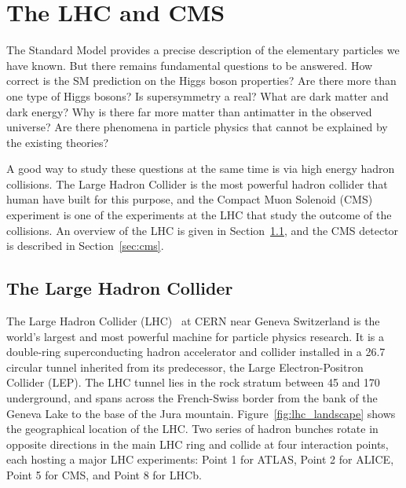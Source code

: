 \chapter{The LHC and CMS}\label{chp:LHC_CMS}

The Standard Model provides a precise description of the elementary particles we have known.
But there remains fundamental questions to be answered.
How correct is the SM prediction on the Higgs boson properties?
Are there more than one type of Higgs bosons?
Is supersymmetry a real?
What are dark matter and dark energy?
Why is there far more matter than antimatter in the observed universe?
Are there phenomena in particle physics that cannot be explained by the existing theories?

A good way to study these questions at the same time is via high energy hadron collisions.
The Large Hadron Collider is the most powerful hadron collider that human have built for this purpose,
and the Compact Muon Solenoid (CMS) experiment is one of the experiments at the LHC that study the outcome of the collisions. 
An overview of the LHC is given in Section~\ref{sec:lhc}, and the CMS detector is described in Section~\ref{sec:cms}.

\section{The Large Hadron Collider}\label{sec:lhc}

The Large Hadron Collider (LHC)~\cite{Evans_2008} at CERN near Geneva Switzerland is the world's largest and most powerful machine for particle physics research.
It is a double-ring superconducting hadron accelerator and collider installed in a 26.7 \km circular tunnel inherited from its predecessor, the Large Electron-Positron Collider (LEP).
The LHC tunnel lies in the rock stratum between 45 \meter and 170 \meter underground, 
and spans across the French-Swiss border from the bank of the Geneva Lake to the base of the Jura mountain.   
Figure~\ref{fig:lhc_landscape} shows the geographical location of the LHC. 
Two series of hadron bunches rotate in opposite directions in the main LHC ring and collide at four interaction points, 
each hosting a major LHC experiments: Point 1 for ATLAS, Point 2 for ALICE, Point 5 for CMS, and Point 8 for LHCb.

